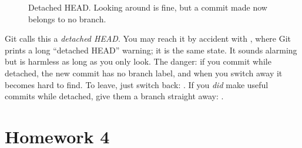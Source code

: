 \begin{figure}[H]
\centering
{}
\caption{Detached HEAD. Looking around is fine, but a commit made now belongs to no branch.}
\label{fig:detached}
\end{figure}

Git calls this a \emph{detached HEAD}. You may reach it by accident with , where Git prints a long ``detached HEAD'' warning; it is the same state. It sounds alarming but is harmless as long as you only look. The danger: if you commit while detached, the new commit has no branch label, and when you switch away it becomes hard to find. To leave, just switch back: . If you \emph{did} make useful commits while detached, give them a branch straight away: .

\section{Homework 4}

